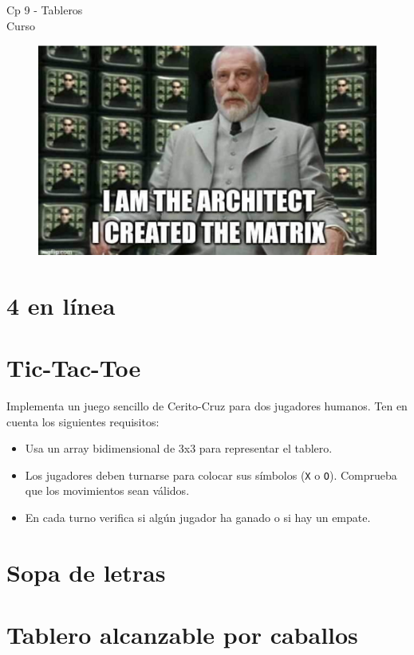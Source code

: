 \begin{center}
    \begin{large}
    Cp 9 - Tableros\\
    Curso \academicyear\\
    \end{large}
    \begin{figure}[h]
    	\centering
    	\includegraphics[width=0.5\linewidth]{cp7/matrix.png}
    \end{figure}
\end{center}

\section{4 en línea}


\section{Tic-Tac-Toe}
Implementa un juego sencillo de Cerito-Cruz para dos jugadores humanos. Ten en cuenta los siguientes requisitos:
\begin{itemize}
    \item Usa un array bidimensional de 3x3 para representar el tablero.
    \item Los jugadores deben turnarse para colocar sus símbolos (\texttt{X} o \texttt{O}). Comprueba que los movimientos sean válidos.
    \item En cada turno verifica si algún jugador ha ganado o si hay un empate.
\end{itemize}

\section{Sopa de letras}


\section{Tablero alcanzable por caballos}



